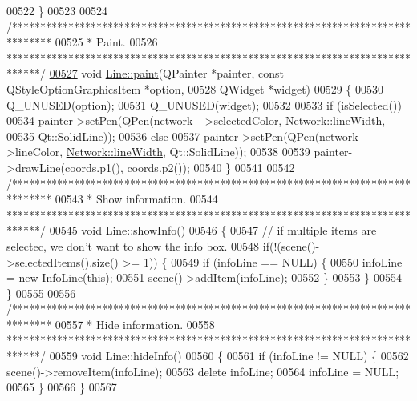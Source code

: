 \begin{DoxyCode}
00522 \}
00523 
00524 \textcolor{comment}{/*******************************************************************************}
00525 \textcolor{comment}{ * Paint.}
00526 \textcolor{comment}{ ******************************************************************************/}
\hypertarget{line_8cpp_source_l00527}{}\hyperlink{group___models_ga0aa64aed379d434be5942edf572b444b}{00527} \textcolor{keywordtype}{void} \hyperlink{group___models_ga0aa64aed379d434be5942edf572b444b}{Line::paint}(QPainter *painter, \textcolor{keyword}{const} QStyleOptionGraphicsItem *option,
00528                  QWidget *widget)
00529 \{
00530   Q\_UNUSED(option);
00531   Q\_UNUSED(widget);
00532 
00533   \textcolor{keywordflow}{if} (isSelected())
00534     painter->setPen(QPen(network\_->selectedColor, \hyperlink{group___models_ga3f810634c9908d62d33a1ab09a76c147}{Network::lineWidth},
00535                          Qt::SolidLine));
00536   \textcolor{keywordflow}{else}
00537     painter->setPen(QPen(network\_->lineColor, \hyperlink{group___models_ga3f810634c9908d62d33a1ab09a76c147}{Network::lineWidth}, Qt::SolidLine));
00538 
00539   painter->drawLine(coords.p1(), coords.p2());
00540 \}
00541 
00542 \textcolor{comment}{/*******************************************************************************}
00543 \textcolor{comment}{ * Show information.}
00544 \textcolor{comment}{ ******************************************************************************/}
00545 \textcolor{keywordtype}{void} Line::showInfo()
00546 \{
00547   \textcolor{comment}{// if multiple items are selectec, we don't want to show the info box.}
00548   \textcolor{keywordflow}{if}(!(scene()->selectedItems().size() >= 1)) \{
00549     \textcolor{keywordflow}{if} (infoLine == NULL) \{
00550       infoLine = \textcolor{keyword}{new} \hyperlink{class_info_line}{InfoLine}(\textcolor{keyword}{this});
00551       scene()->addItem(infoLine);
00552     \}
00553   \}
00554 \}
00555 
00556 \textcolor{comment}{/*******************************************************************************}
00557 \textcolor{comment}{ * Hide information.}
00558 \textcolor{comment}{ ******************************************************************************/}
00559 \textcolor{keywordtype}{void} Line::hideInfo()
00560 \{
00561   \textcolor{keywordflow}{if} (infoLine != NULL) \{
00562     scene()->removeItem(infoLine);
00563     \textcolor{keyword}{delete} infoLine;
00564     infoLine = NULL;
00565   \}
00566 \}
00567 
\end{DoxyCode}
